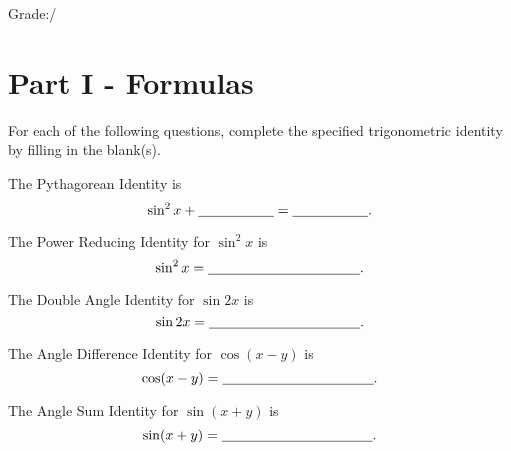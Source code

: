 \documentclass[addpoints]{exam}
\begin{document}
\vspace{1in}

\noindent{} \hspace{.5in} Grade:\enspace\hrulefill/\numpoints

\vspace{.1in}

\begin{center}
\end{center}

\section*{Part I - Formulas}

\noindent For each of the following questions, complete the specified trigonometric identity by filling in the blank(s).
\begin{questions}
\question[1] The Pythagorean Identity is \[\sin^2 x + \underline{\hspace{.75in}} = \underline{\hspace{.75in}}.\]


\question[1] The Power Reducing Identity for $\sin^2 x$ is \[\sin^2 x = \underline{\hspace{1.5in}}.\]


\question[1] The Double Angle Identity for $\sin 2x$ is \[\sin 2x = \underline{\hspace{1.5in}}.\]


\question[1] The Angle Difference Identity for $\cos(x-y)$ is \[\cos(x-y) = \underline{\hspace{1.5in}}.\]


\question[1] The Angle Sum Identity for $\sin(x+y)$ is \[\sin(x+y) = \underline{\hspace{1.5in}}.\]

\end{questions}
\end{document}
